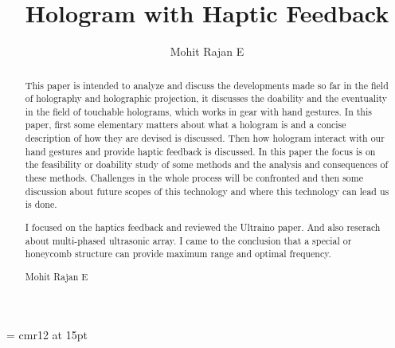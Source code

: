 \documentclass{fisatproject}
\title{Hologram with Haptic Feedback}
\author{Mohit Rajan E}
\begin{document}
\maketitle
\makecert
\font\secfont =  cmr12 at 15pt
\newpage
{}
\setcounter{page}{1}
\thispagestyle{plain}
\renewcommand\abstractname{ABSTRACT}
\begin{abstract}
\vspace{5cm}
This paper is intended to analyze and discuss the developments made so far in the field of holography and holographic projection, it discusses the doability and the eventuality in the field of touchable holograms, which works in gear with hand gestures. In this paper, first some elementary matters about what a hologram is and a concise description of how they are devised is discussed. Then how hologram interact with our hand gestures and provide haptic feedback is discussed. In this paper the focus is on the feasibility or doability study of some methods and the analysis and consequences of these methods. Challenges in the whole process will be confronted and then some discussion about future scopes of this technology and where this technology can lead us is done.
\end{abstract}



\newpage
\renewcommand\abstractname{Contribution by Author}
\thispagestyle{plain}
\begin{abstract}
\vspace{5cm}
I focused on the haptics feedback and reviewed the Ultraino paper. And also reserach about multi-phased ultrasonic array. I came to the conclusion that a special or honeycomb structure can provide maximum range and optimal frequency.
\vspace{1cm}
\begin{flushright}
Mohit Rajan E
\end{flushright}
\end{abstract}
\end{document}
